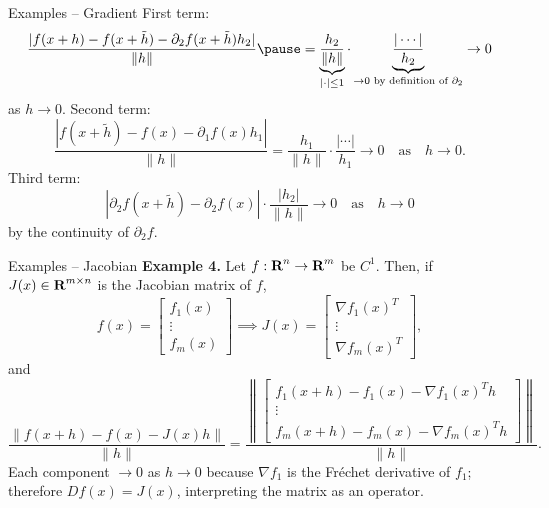 \documentclass[]{beamer}
\begin{document}
	\begin{frame}{Examples -- Gradient}
		First term:
		{\small
		\begin{equation*}
			\frac{|f(x+h) - f(x+\tilde{h}) - \partial_2f(x+\tilde{h})h_2|}{\lVert h \rVert} \pause= \underbrace{\frac{h_2}{\lVert h\rVert}}_{|\cdot|\le 1}\cdot\underbrace{\frac{|\cdots|}{h_2}}_{\to 0\text{ by definition of }\partial_2} \to 0
		\end{equation*}
		}%
		as $h\to 0$.
		\pause
		\vfill
		Second term:
		{\small
		\begin{equation*}
			\frac{|f(x+\tilde{h}) - f(x) - \partial_1f(x)h_1|}{\lVert h \rVert} = \frac{h_1}{\lVert h\rVert}\cdot \frac{|\cdots|}{h_1} \to 0\quad \text{as}\quad h\to 0.
		\end{equation*}
		}%
		\pause
		\vfill
		Third term:
		{\small
		\begin{equation*}
			|\partial_2f(x+\tilde{h}) - \partial_2f(x)|\cdot\frac{|h_2|}{\lVert h\rVert} \to 0 \quad\text{as}\quad h\to 0
		\end{equation*}	
		}%
		by the continuity of $\partial_2f$.
	\end{frame}
	
	\begin{frame}{Examples -- Jacobian}
		\textbf{Example 4.} Let $f : \textnormal{\bf R}^n \to \textnormal{\bf R}^m$ be $C^1$.
		\vfill
		\pause
		Then, if $J(x) \in \textnormal{\bf R}^{m\times n}$ is the Jacobian matrix of $f$,
		\begin{equation*}
			f(x) = \left[\begin{matrix}f_1(x) \\ \vdots \\f_m(x)\end{matrix}\right] \implies J(x) = \left[\begin{matrix}\nabla f_1(x)^T \\ \vdots \\ \nabla f_m(x)^T\end{matrix}\right],
		\end{equation*}
		\pause
		and
		{\small
		\begin{equation*}
			\frac{\left\lVert f(x+h) - f(x) - J(x)h\right\rVert}{\lVert h\rVert} = \frac{\left\lVert \left[\begin{matrix}f_1(x+h) - f_1(x) - \nabla f_1(x)^Th \\ \vdots \\ f_m(x+h) - f_m(x) - \nabla f_m(x)^Th\end{matrix}\right]\right\rVert}{\lVert h \rVert}.
		\end{equation*}
		}%
		\pause
		Each component $\to 0$ as $h\to 0$ because $\nabla f_1$ is the Fréchet derivative of $f_1$; therefore $Df(x) = J(x)$, interpreting the matrix as an operator.
	\end{frame}
	
\end{document}

